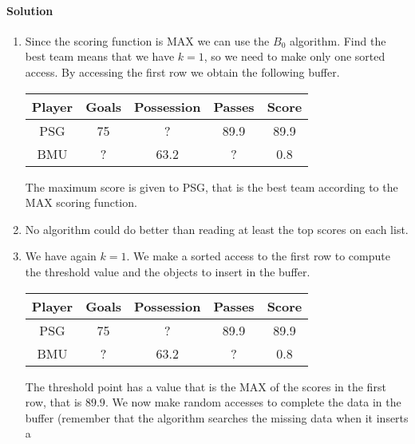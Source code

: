 \paragraph*{Solution}
\begin{enumerate}
    \item Since the scoring function is MAX we can use the $B_0$ algorithm. Find the best team means that we have $k=1$, so we 
        need to make only one sorted access. By accessing the first row we obtain the following buffer. 
        \begin{table}[H]
            \centering
            \begin{tabular}{c|ccc|c}
            \hline
            \textbf{Player} & \textbf{Goals} & \textbf{Possession} & \textbf{Passes} & \textbf{Score} \\ \hline
            PSG             & 75             & ?                   & 89.9            & 89.9           \\
            BMU             & ?              & 63.2                & ?               & 0.8            \\ \hline
            \end{tabular}
        \end{table}
        The maximum score is given to PSG, that is the best team according to the MAX scoring function. 
    \item No algorithm could do better than reading at least the top scores on each list. 
    \item We have again $k=1$. We make a sorted access to the first row to compute the threshold value and 
        the objects to insert in the buffer. 
        \begin{table}[H]
            \centering
            \begin{tabular}{c|ccc|c}
            \hline
            \textbf{Player} & \textbf{Goals} & \textbf{Possession} & \textbf{Passes} & \textbf{Score} \\ \hline
            PSG             & 75             & ?                   & 89.9            & 89.9           \\
            BMU             & ?              & 63.2                & ?               & 0.8            \\ \hline
            \end{tabular}
        \end{table}
        The threshold point has a value that is the MAX of the scores in the first row, that is $89.9$. We now make random 
        accesses to complete the data in the buffer (remember that the algorithm searches the missing data when it inserts a 

\end{enumerate}
